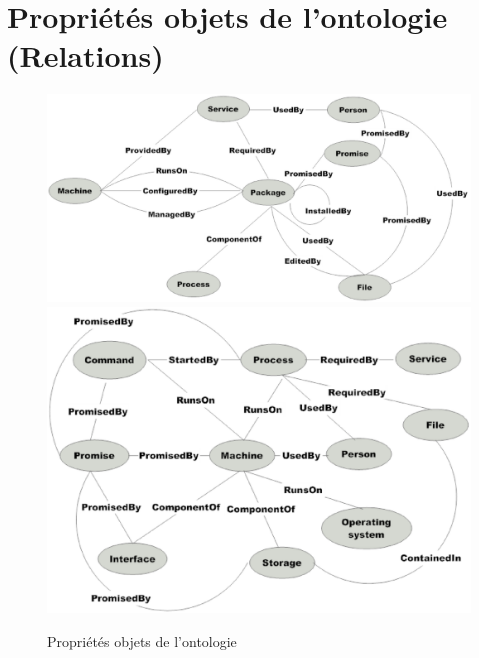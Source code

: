 \section{Propriétés objets de l'ontologie (Relations)}

\begin{figure}[H]
    \centering
    \includegraphics[width=.8\textwidth]{img/ontology_relations1}
    \includegraphics[width=.8\textwidth]{img/ontology_relations2}
    \caption{Propriétés objets de l'ontologie}
    \label{fig:ontology_entities}
\end{figure}

